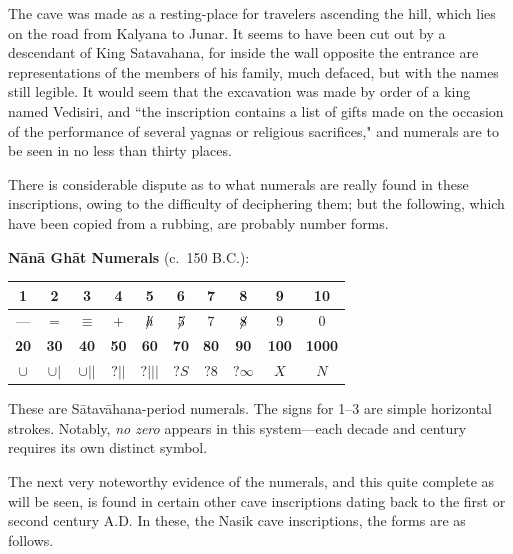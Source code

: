 \documentclass[11pt,a4paper]{article}
\newcommand{\dev}[1]{{\devanagarifont #1}}
\newenvironment{enhancednote}{%
  \begin{tcolorbox}[colback=enhancedbg,colframe=notecolor,boxrule=1pt,
    left=10pt,right=10pt,top=8pt,bottom=8pt,
    title={\textbf{Enhanced Edition Note}},fonttitle=\bfseries\color{notecolor}]
}{\end{tcolorbox}}
\begin{document}
The cave was made as a resting-place for travelers ascending the hill, which lies on the road from Kalyana to Junar. It seems to have been cut out by a descendant of King Satavahana, for inside the wall opposite the entrance are representations of the members of his family, much defaced, but with the names still legible. It would seem that the excavation was made by order of a king named Vedisiri, and ``the inscription contains a list of gifts made on the occasion of the performance of several yagnas or religious sacrifices," and numerals are to be seen in no less than thirty places.

There is considerable dispute as to what numerals are really found in these inscriptions, owing to the difficulty of deciphering them; but the following, which have been copied from a rubbing, are probably number forms.

\begin{enhancednote}
\textbf{N\=an\=a Gh\=at Numerals} (c.~150 B.C.):

\begin{center}
\begin{tabular}{|*{10}{c|}}
\hline
\textbf{1} & \textbf{2} & \textbf{3} & \textbf{4} & \textbf{5} & \textbf{6} & \textbf{7} & \textbf{8} & \textbf{9} & \textbf{10} \\
\hline
\dev{—} & $=$ & $\equiv$ & $+$ & $\not\!h$ & $\not\!5$ & $7$ & $\not\!8$ & $9$ & $0$ \\
\hline
\textbf{20} & \textbf{30} & \textbf{40} & \textbf{50} & \textbf{60} & \textbf{70} & \textbf{80} & \textbf{90} & \textbf{100} & \textbf{1000} \\
\hline
$\cup$ & $\cup\!\!|$ & $\cup\!||$ & $?\!||$ & $?\!|||$ & $?\!S$ & $?\!8$ & $?\!\infty$ & $X$ & $N$ \\
\hline
\end{tabular}
\end{center}

These are S\=atav\=ahana-period numerals. The signs for 1--3 are simple horizontal strokes. Notably, \textit{no zero} appears in this system---each decade and century requires its own distinct symbol.
\end{enhancednote}

The next very noteworthy evidence of the numerals, and this quite complete as will be seen, is found in certain other cave inscriptions dating back to the first or second century A.D. In these, the Nasik cave inscriptions, the forms are as follows.
\end{document}
